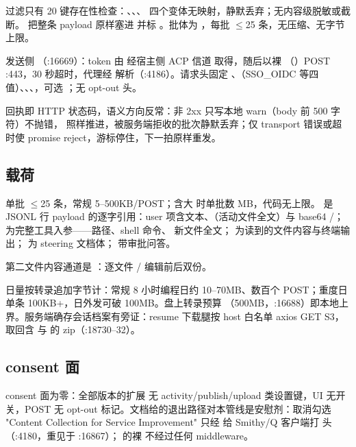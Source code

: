 过滤只有  20 键存在性检查：、、、 四个变体无映射，静默丢弃；无内容级脱敏或截断。 把整条 payload 原样塞进  并标 。批体为 ，每批 $\le$25 条，无压缩、无字节上限。

发送侧 （:16669）：token 由  经宿主侧 ACP 信道  取得，随后以裸 （）POST :443，30 秒超时，代理经  解析（:4186）。请求头固定 、（SSO\_OIDC 等四值）、、、，可选 ；无 opt-out 头。

回执即 HTTP 状态码，语义方向反常：非 2xx 只写本地 warn（body 前 500 字符）不抛错， 照样推进，被服务端拒收的批次静默丢弃；仅 transport 错误或超时使 promise reject，游标停住，下一拍原样重发。

\subsection{载荷}

单批 $\le$25 条，常规 5--500KB/POST；含大  时单批数 MB，代码无上限。 是 JSONL 行 payload 的逐字引用：user 项含文本、（活动文件全文）与 base64 /； 为完整工具入参——路径、shell 命令、 新文件全文； 为读到的文件内容与终端输出； 为 steering 文档体； 带审批问答。

第二文件内容通道是 ：逐文件 / 编辑前后双份。

日量按转录追加字节计：常规 8 小时编程日约 10--70MB、数百个 POST；重度日单条 100KB+，日外发可破 100MB。盘上转录预算 （500MB，:16688）即本地上界。服务端确存会话档案有旁证：resume 下载腿按 host 白名单 axios GET S3，取回含  与  的 zip（:18730--32）。

\subsection{consent 面}

consent 面为零：全部版本的扩展  无 activity/publish/upload 类设置键，UI 无开关，POST 无 opt-out 标记。文档给的退出路径对本管线是安慰剂：取消勾选 "Content Collection for Service Improvement" 只经  给 Smithy/Q 客户端打  头（:4180，重见于 :16867）； 的裸  不经过任何 middleware。

